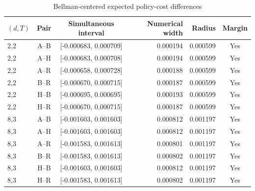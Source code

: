 \begin{table}[htbp]
\centering\caption{Bellman-centered expected policy-cost differences}\label{tab:inference70}
{\small\setlength{\tabcolsep}{3pt}
\begin{tabular}{lccrrc}
\hline
$(d,T)$ & Pair & Simultaneous interval & Numerical width & Radius & Margin \\
\hline
2,2 & A--B & [-0.000683, 0.000709] & 0.000194 & 0.000599 & Yes \\
2,2 & A--H & [-0.000683, 0.000708] & 0.000194 & 0.000599 & Yes \\
2,2 & A--R & [-0.000658, 0.000728] & 0.000188 & 0.000599 & Yes \\
2,2 & B--R & [-0.000670, 0.000715] & 0.000187 & 0.000599 & Yes \\
2,2 & H--B & [-0.000695, 0.000695] & 0.000193 & 0.000599 & Yes \\
2,2 & H--R & [-0.000670, 0.000715] & 0.000187 & 0.000599 & Yes \\
8,3 & A--B & [-0.001603, 0.001603] & 0.000812 & 0.001197 & Yes \\
8,3 & A--H & [-0.001603, 0.001603] & 0.000812 & 0.001197 & Yes \\
8,3 & A--R & [-0.001583, 0.001613] & 0.000801 & 0.001197 & Yes \\
8,3 & B--R & [-0.001583, 0.001613] & 0.000802 & 0.001197 & Yes \\
8,3 & H--B & [-0.001603, 0.001603] & 0.000812 & 0.001197 & Yes \\
8,3 & H--R & [-0.001583, 0.001613] & 0.000802 & 0.001197 & Yes \\
\hline\end{tabular}}
\par{}
\end{table}
